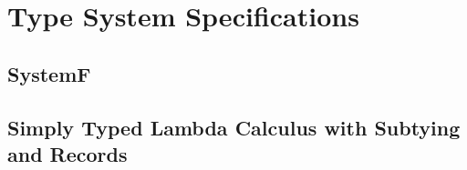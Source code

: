\chapter{Type System Specifications}
\section{SystemF}
\label{appendix:systemf}




\section{Simply Typed Lambda Calculus with Subtying and Records}
\label{appendix:stlc-records}


